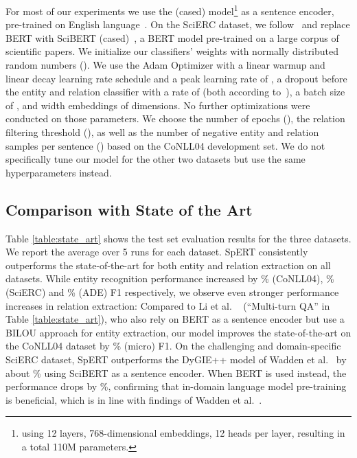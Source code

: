 \documentclass{ecai}
\begin{document}
For most of our experiments we use the  (cased) model\footnote{using 12 layers, 768-dimensional embeddings, 12 heads per layer, resulting in a total 110M parameters.} as a sentence encoder, pre-trained on English language~\cite{devlin:2018:bert}. On the SciERC dataset, we follow~\cite{wadden:2019:dygie++} and replace BERT with SciBERT (cased)~\cite{beltagy:2019:scibert}, a BERT model pre-trained on a large corpus of scientific papers.
We initialize our classifiers' weights with normally distributed random numbers ().
We use the Adam Optimizer with a linear warmup and linear decay learning rate schedule and a peak learning rate of , a dropout before the entity and relation classifier with a rate of  (both according to~\cite{devlin:2018:bert}), a batch size of , and width embeddings  of  dimensions. No further optimizations were conducted on those parameters. We choose the number of epochs (), the relation filtering threshold (), as well as the number of negative entity and relation samples per sentence () based on the CoNLL04 development set. We do not specifically tune our model for the other two datasets but use the same hyperparameters instead.







\subsection{Comparison with State of the Art}

Table \ref{table:state_art} shows the test set evaluation results for the three datasets. We report the average over 5 runs for each dataset. SpERT consistently outperforms the state-of-the-art for both entity and relation extraction on all datasets. While entity recognition performance increased by \% (CoNLL04), \% (SciERC) and \% (ADE) F1 respectively, we observe even stronger performance increases in relation extraction: Compared to Li et al. ~\cite{li:2019:joint_bert} (\enquote{Multi-turn QA} in Table \ref{table:state_art}), who also rely on BERT as a sentence encoder but use a BILOU approach for entity extraction, our model improves the state-of-the-art on the CoNLL04 dataset by \% (micro) F1. 
On the challenging and domain-specific SciERC dataset, SpERT outperforms 
the DyGIE++ model of Wadden et al.~\cite{wadden:2019:dygie++} by about \% using SciBERT as a sentence encoder. When BERT is used instead, the performance drops by \%, confirming that in-domain language model pre-training is beneficial, which is in line with findings of Wadden et al.~\cite{wadden:2019:dygie++}. 
\end{document}
